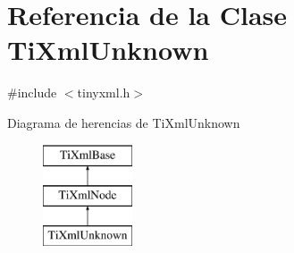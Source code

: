 \hypertarget{class_ti_xml_unknown}{\section{Referencia de la Clase Ti\-Xml\-Unknown}
\label{class_ti_xml_unknown}
}


{\ttfamily \#include $<$tinyxml.\-h$>$}

Diagrama de herencias de Ti\-Xml\-Unknown\begin{figure}[H]
\begin{center}
\leavevmode
\includegraphics[height=3.000000cm]{class_ti_xml_unknown}
\end{center}
\end{figure}
